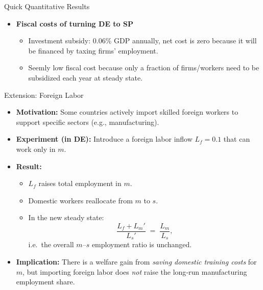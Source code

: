 \documentclass[9pt,xcolor={svgnames}]{beamer}
\begin{document}
\begin{frame}{Quick Quantitative Results}
    \begin{itemize}
\item \textbf{Fiscal costs of turning DE to SP}
\begin{itemize}
\vspace{1mm}
    \item Investment subsidy: 0.06\% GDP annually, net cost is zero because it will be financed by taxing firms' employment.

    \vspace{1mm}

    \item Seemly  low fiscal cost because only a fraction of firms/workers need to be subsidized each year at steady state.
\end{itemize}
\color{black}
    \end{itemize}
\end{frame}

\begin{frame}{Extension: Foreign Labor}

\begin{itemize}
    \item \textbf{Motivation:} Some countries actively import skilled foreign workers to support specific sectors (e.g., manufacturing).

    \medskip

    \item \textbf{Experiment (in DE):} Introduce a foreign labor inflow $L_f = 0.1$ that can work only in $m$.

    \medskip

    \item \textbf{Result:} 
    \begin{itemize}
        \item $L_f$ raises total employment in $m$.
        \item Domestic workers reallocate from $m$ to $s$.
        \item In the new steady state:
        \[
        \frac{L_f + L_m'}{L_s'} \;=\; \frac{L_m}{L_s},
        \]
        i.e.\ the overall $m$–$s$ employment ratio is unchanged.
    \end{itemize}

    \medskip

    \item \textbf{Implication:} There is a welfare gain from \emph{saving domestic training costs} for $m$,  
    but importing foreign labor does \emph{not} raise the long‐run manufacturing employment share.
\end{itemize}
    
\end{frame}
\end{document}
